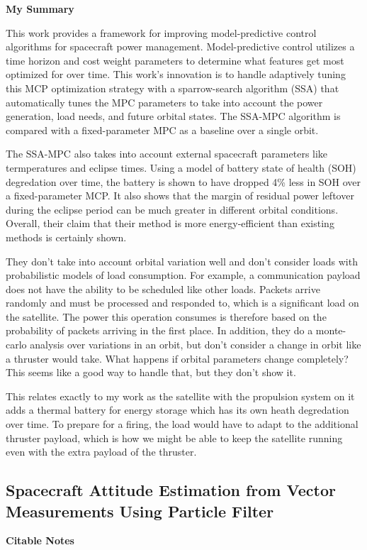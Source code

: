 \textbf{My Summary} 

This work provides a framework for improving model-predictive control algorithms for spacecraft power management. Model-predictive control utilizes a time horizon and cost weight parameters to determine what features get most optimized for over time. This work's innovation is to handle adaptively tuning this MCP optimization strategy with a sparrow-search algorithm (SSA) that automatically tunes the MPC parameters to take into account the power generation, load needs, and future orbital states. The SSA-MPC algorithm is compared with a fixed-parameter MPC as a baseline over a single orbit.

The SSA-MPC also takes into account external spacecraft parameters like termperatures and eclipse times. Using a model of battery state of health (SOH) degredation over time, the battery is shown to have dropped 4\% less in SOH over a fixed-parameter MCP. It also shows that the margin of residual power leftover during the eclipse period can be much greater in different orbital conditions. Overall, their claim that their method is more energy-efficient than existing methods is certainly shown.

They don't take into account orbital variation well and don't consider loads with probabilistic models of load consumption. For example, a communication payload does not have the ability to be scheduled like other loads. Packets arrive randomly and must be processed and responded to, which is a significant load on the satellite. The power this operation consumes is therefore based on the probability of packets arriving in the first place. In addition, they do a monte-carlo analysis over variations in an orbit, but don't consider a change in orbit like a thruster would take. What happens if orbital parameters change completely? This seems like a good way to handle that, but they don't show it. 

This relates exactly to my work as the satellite with the propulsion system on it adds a thermal battery for energy storage which has its own heath degredation over time. To prepare for a firing, the load would have to adapt to the additional thruster payload, which is how we might be able to keep the satellite running even with the extra payload of the thruster.

\subsection{Spacecraft Attitude Estimation from Vector Measurements Using Particle Filter} 
\textbf{Citable Notes} 

